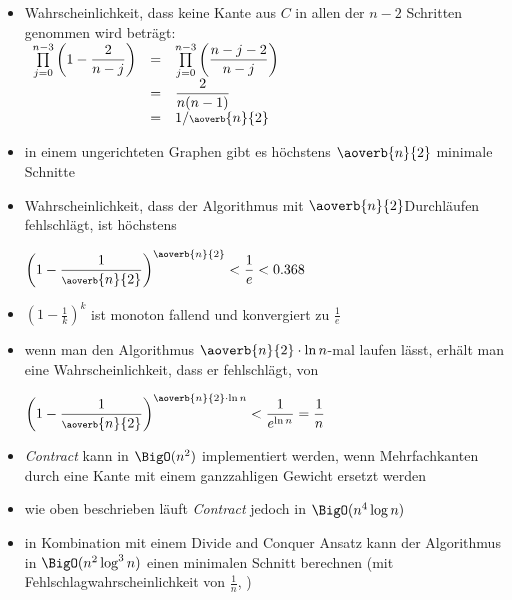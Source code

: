 \begin{itemize}[itemsep=-1pt]
\begin{itemize}
\begin{enumerate}
					\end{enumerate}
				\item Wahrscheinlichkeit, dass keine Kante aus $C$ in allen der $n-2$ Schritten genommen wird beträgt:\\
					$\begin{array}{rcl}
						\prod\limits_{j=0}^{n-3} \left(1-\dfrac{2}{n-j}\right)& = & \prod\limits_{j=0}^{n-3} \left(\dfrac{n-j-2}{n-j}\right)\\
						&=&\dfrac{2}{n(n-1)}\\
						&=&1/\scriptsize{\aoverb{n}{2}}
					\end{array}$
			\end{itemize}
\end{itemize}
\topbreak
\up\up
\begin{itemize}
	\item in einem ungerichteten Graphen gibt es höchstens $\aoverb{n}{2}$ minimale Schnitte
	\item Wahrscheinlichkeit, dass der Algorithmus mit \scriptsize{$\aoverb{n}{2}$}\normalsize Durchläufen fehlschlägt, ist höchstens
		\begin{center}
		$\left(1-\dfrac{1}{\scriptsize{\aoverb{n}{2}}}\right)^{\scriptsize{\aoverb{n}{2}}}<\dfrac{1}{e}<0.368$
		\end{center}
	\item $\left(1-\frac{1}{k}\right)^k$ ist monoton fallend und konvergiert zu $\frac{1}{e}$
	\item wenn man den Algorithmus \scriptsize{$\aoverb{n}{2}\cdot \ln n$}\normalsize-mal laufen lässt, erhält man eine Wahrscheinlichkeit, dass er fehlschlägt, von
		\begin{center}
		$\left(1-\dfrac{1}{\scriptsize{\aoverb{n}{2}}}\right)^{\scriptsize{\aoverb{n}{2}}\cdot \ln n}<\dfrac{1}{e^{\ln n}}=\dfrac{1}{n}$
		\end{center}
	\item \textit{Contract} kann in $\BigO(n^2)$ implementiert werden, wenn Mehrfachkanten durch eine Kante mit einem ganzzahligen Gewicht ersetzt werden
	\item wie oben beschrieben läuft \textit{Contract} jedoch in $\BigO(n^4\log n)$
	\item in Kombination mit einem Divide and Conquer Ansatz kann der Algorithmus in $\BigO(n^2\log^3 n)$ einen minimalen Schnitt berechnen (mit Fehlschlagwahrscheinlichkeit von $\frac{1}{n}$, )\vspace*{-0.5\baselineskip}%
		\begin{itemize}

\end{itemize}
\end{itemize}
